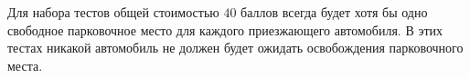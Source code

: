 Для набора тестов общей стоимостью $40$ баллов всегда будет хотя бы одно свободное парковочное место для каждого приезжающего автомобиля. В этих тестах никакой автомобиль не
должен будет ожидать освобождения парковочного места.